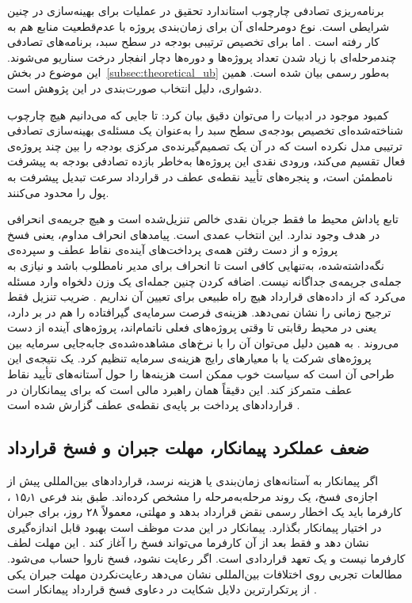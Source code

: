 برنامه‌ریزی تصادفی \citep{Birge2011} چارچوب استاندارد تحقیق در
عملیات برای بهینه‌سازی در چنین شرایطی است. نوع دومرحله‌ای آن برای
زمان‌بندی پروژه با عدم‌قطعیت منابع هم به کار رفته است
\citep{Lova2000}.
اما برای تخصیص ترتیبی بودجه در سطح سبد، برنامه‌های تصادفی چندمرحله‌ای
با زیاد شدن تعداد پروژه‌ها و دوره‌ها دچار انفجار درخت سناریو
می‌شوند. این موضوع در بخش~\ref{subsec:theoretical_ub} به‌طور رسمی
بیان شده است. همین دشواری، دلیل انتخاب صورت‌بندی  در این
پژوهش است.

کمبود موجود در ادبیات را می‌توان دقیق بیان کرد:
تا جایی که می‌دانیم هیچ چارچوب شناخته‌شده‌ای تخصیص بودجه‌ی سطح سبد
را به‌عنوان یک مسئله‌ی بهینه‌سازی تصادفی ترتیبی مدل نکرده است که در
آن یک تصمیم‌گیرنده‌ی مرکزی بودجه را بین چند پروژه‌ی فعال تقسیم
می‌کند، ورودی نقدی این پروژه‌ها به‌خاطر بازده تصادفی بودجه به پیشرفت
نامطمئن است، و پنجره‌های تأیید نقطه‌ی عطف در قرارداد سرعت تبدیل
پیشرفت به پول را محدود می‌کنند.

تابع پاداش محیط ما فقط جریان نقدی خالص تنزیل‌شده است و هیچ جریمه‌ی
انحرافی در هدف وجود ندارد.
این انتخاب عمدی است. پیامدهای انحراف مداوم، یعنی فسخ پروژه و از
دست رفتن همه‌ی پرداخت‌های آینده‌ی نقاط عطف و سپرده‌ی نگه‌داشته‌شده،
به‌تنهایی کافی است تا انحراف برای مدیر نامطلوب باشد و نیازی به جمله‌ی
جریمه‌ی جداگانه نیست. اضافه کردن چنین جمله‌ای یک وزن دلخواه وارد
مسئله می‌کرد که از داده‌های قرارداد هیچ راه طبیعی برای تعیین آن
نداریم \citep{Ng1999}.
ضریب تنزیل فقط ترجیح زمانی را نشان نمی‌دهد. هزینه‌ی فرصت سرمایه‌ی
گیرافتاده را هم در بر دارد، یعنی در محیط رقابتی تا وقتی پروژه‌های
فعلی ناتمام‌اند، پروژه‌های آینده از دست می‌روند
\citep{Damodaran2012}. به همین دلیل می‌توان آن را با نرخ‌های مشاهده‌شده‌ی
جابه‌جایی سرمایه بین پروژه‌های شرکت یا با معیارهای رایج هزینه‌ی
سرمایه تنظیم کرد.
یک نتیجه‌ی این طراحی آن است که سیاست خوب ممکن است هزینه‌ها را حول
آستانه‌های تأیید نقاط عطف متمرکز کند. این دقیقاً همان راهبرد مالی
است که برای پیمانکاران در قراردادهای پرداخت بر پایه‌ی نقطه‌ی عطف
گزارش شده است \citep{Kenley2009, Kaka1993, Arditi2005}.

\subsection{ضعف عملکرد پیمانکار، مهلت جبران و فسخ قرارداد}
\label{subsec:lr_interventions}

اگر پیمانکار به آستانه‌های زمان‌بندی یا هزینه نرسد، قراردادهای
بین‌المللی  پیش از اجازه‌ی فسخ، یک روند مرحله‌به‌مرحله را
مشخص کرده‌اند.
طبق بند فرعی ۱۵٫۱ ، کارفرما باید یک اخطار رسمی نقض
قرارداد بدهد و مهلتی، معمولاً ۲۸ روز، برای جبران در اختیار پیمانکار
بگذارد. پیمانکار در این مدت موظف است بهبود قابل اندازه‌گیری نشان
دهد و فقط بعد از آن کارفرما می‌تواند فسخ را آغاز کند
\citep{FIDIC2017, Ndekugri2008}.
این مهلت لطف کارفرما نیست و یک تعهد قراردادی است. اگر رعایت نشود،
فسخ ناروا حساب می‌شود.
مطالعات تجربی روی اختلافات بین‌المللی  نشان می‌دهد
رعایت‌نکردن مهلت جبران یکی از پرتکرارترین دلایل شکایت در دعاوی فسخ
قرارداد پیمانکار است \citep{Ndekugri2008, Ennis2021}.

